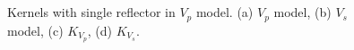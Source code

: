 \documentclass[extra,mreferee]{gji}
\begin{document}
\begin{figure}
   \centering
   \\
   \\
   \caption{Kernels with single reflector in $V_p$ model. (a) $V_p$ model, (b) $V_s$ model, (c) $K_{V_p}$, (d) $K_{V_s}$.}
   \label{fig:kernel1_vp}
\end{figure}
\end{document}
